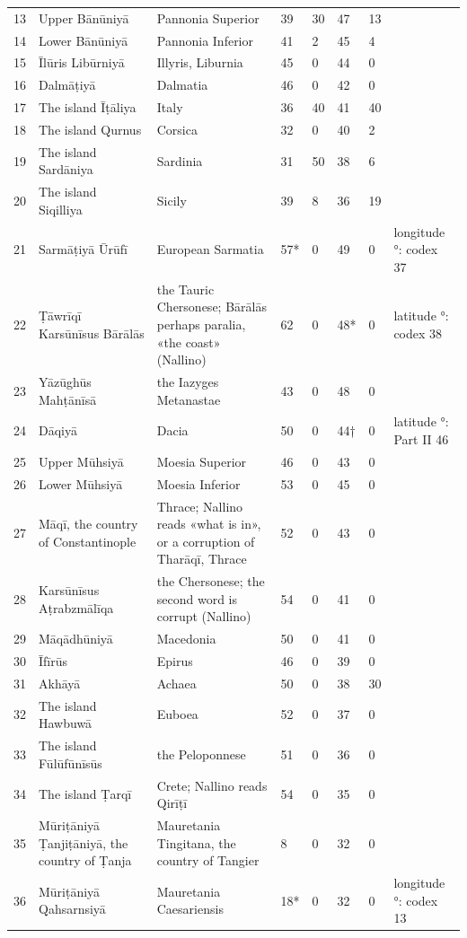 {\begin{longtable}{R{8mm}L{42mm}L{34mm}R{7mm}R{6mm}R{6mm}R{6mm}L{24mm}}
13 & Upper Bānūniyā & Pannonia Superior & 39 & 30 & 47 & 13 & \\
14 & Lower Bānūniyā & Pannonia Inferior & 41 & 2 & 45 & 4 & \\
15 & Īlūris Libūrniyā & Illyris, Liburnia & 45 & 0 & 44 & 0 & \\
16 & Dalmāṭiyā & Dalmatia & 46 & 0 & 42 & 0 & \\
17 & The island Īṭāliya & Italy & 36 & 40 & 41 & 40 & \\
18 & The island Qurnus & Corsica & 32 & 0 & 40 & 2 & \\
19 & The island Sardāniya & Sardinia & 31 & 50 & 38 & 6 & \\
20 & The island Siqilliya & Sicily & 39 & 8 & 36 & 19 & \\
21 & Sarmāṭiyā Ūrūfī & European Sarmatia & 57* & 0 & 49 & 0 & longitude °: codex 37\\
22 & Ṭāwrīqī Karsūnīsus Bārālās & the Tauric Chersonese; Bārālās perhaps paralia, «the coast» (Nallino) & 62 & 0 & 48* & 0 & latitude °: codex 38\\
23 & Yāzūghūs Mahṭānīsā & the Iazyges Metanastae & 43 & 0 & 48 & 0 & \\
24 & Dāqiyā & Dacia & 50 & 0 & 44† & 0 & latitude °: Part II 46\\
25 & Upper Mūhsiyā & Moesia Superior & 46 & 0 & 43 & 0 & \\
26 & Lower Mūhsiyā & Moesia Inferior & 53 & 0 & 45 & 0 & \\
27 & Māqī, the country of Constantinople & Thrace; Nallino reads «what is in», or a corruption of Tharāqī, Thrace & 52 & 0 & 43 & 0 & \\
28 & Karsūnīsus Aṭrabzmālīqa & the Chersonese; the second word is corrupt (Nallino) & 54 & 0 & 41 & 0 & \\
29 & Māqādhūniyā & Macedonia & 50 & 0 & 41 & 0 & \\
30 & Īfīrūs & Epirus & 46 & 0 & 39 & 0 & \\
31 & Akhāyā & Achaea & 50 & 0 & 38 & 30 & \\
32 & The island Hawbuwā & Euboea & 52 & 0 & 37 & 0 & \\
33 & The island Fūlūfūnīsūs & the Peloponnese & 51 & 0 & 36 & 0 & \\
34 & The island Ṭarqī & Crete; Nallino reads Qirīṭī & 54 & 0 & 35 & 0 & \\
35 & Mūriṭāniyā Ṭanjiṭāniyā, the country of Ṭanja & Mauretania Tingitana, the country of Tangier & 8 & 0 & 32 & 0 & \\
36 & Mūriṭāniyā Qahsarnsiyā & Mauretania Caesariensis & 18* & 0 & 32 & 0 & longitude °: codex 13\\

\end{longtable}}
